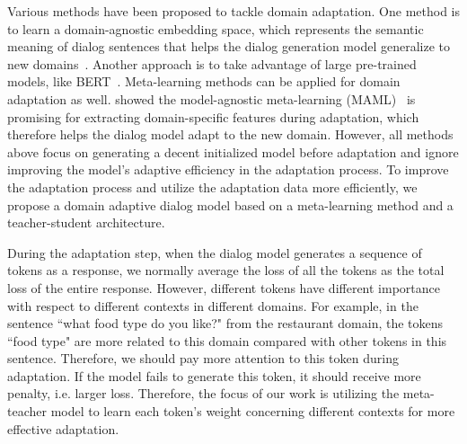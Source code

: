 \documentclass[letterpaper]{article} %
\begin{document}

Various methods have been proposed to tackle domain adaptation.
%
One method is to learn a domain-agnostic embedding space, which represents the semantic meaning of dialog sentences that helps the dialog generation model generalize to new domains~\citep{zhao2018zero}.
%
Another approach is to take advantage of large pre-trained models, like BERT~\citep{Devlin2019BERTPO}.
%
Meta-learning methods can be applied for domain adaptation as well.  \citet{qian2019domain} showed the model-agnostic meta-learning  (MAML)~\citep{finn2017model} is promising for extracting domain-specific features during adaptation, which therefore helps the dialog model adapt to the new domain. 
%
However, all methods above focus on generating a decent initialized model before adaptation and ignore improving the model's adaptive efficiency in the adaptation process. 
%
To improve the adaptation process and utilize the adaptation data more efficiently, we propose a domain adaptive dialog model based on a meta-learning method and a teacher-student architecture.

During the adaptation step, when the dialog model generates a sequence of tokens as a response, we normally average the loss of all the tokens as the total loss of the entire response.
%
However, different tokens have different importance with respect to different contexts in different domains.
%
For example, in the sentence ``what food type do you like?" from the restaurant domain, the tokens ``food type" are more related to this domain compared with other tokens in this sentence.
%
Therefore, we should pay more attention to this token during adaptation.  If the model fails to generate this token, it should receive more penalty, i.e. larger loss.
%
Therefore, the focus of our work is utilizing the meta-teacher model to learn each token's weight concerning different contexts for more effective adaptation.
\end{document}
